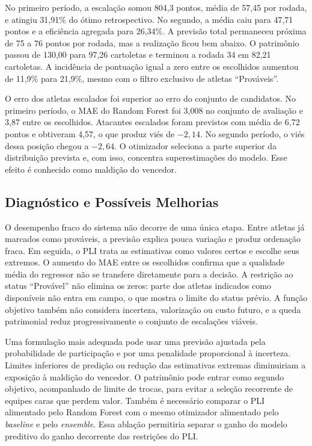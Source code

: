 \documentclass[12pt, a4paper, oneside]{article}
\begin{document}
No primeiro período, a escalação somou 804,3 pontos, média de 57,45 por rodada,
e atingiu 31,91\% do ótimo retrospectivo. No segundo, a média caiu para 47,71
pontos e a eficiência agregada para 26,34\%. A previsão total permaneceu próxima
de 75 a 76 pontos por rodada, mas a realização ficou bem abaixo. O patrimônio
passou de 130,00 para 97,26 cartoletas e terminou a rodada 34 em 82,21 cartoletas.
A incidência de pontuação igual a zero entre os escolhidos aumentou de 11,9\%
para 21,9\%, mesmo com o filtro exclusivo de atletas ``Prováveis''.

O erro dos atletas escalados foi superior ao erro do conjunto de candidatos. No
primeiro período, o MAE do Random Forest foi 3,008 no conjunto de avaliação e
3,87 entre os escolhidos. Atacantes escalados foram previstos com média de 6,72
pontos e obtiveram 4,57, o que produz viés de $-2,14$. No segundo período, o viés
dessa posição chegou a $-2,64$. O otimizador seleciona a parte superior da
distribuição prevista e, com isso, concentra superestimações do modelo. Esse
efeito é conhecido como maldição do vencedor.

\subsection{Diagnóstico e Possíveis Melhorias}

O desempenho fraco do sistema não decorre de uma única etapa. Entre atletas já
marcados como prováveis, a previsão explica pouca variação e produz ordenação
fraca. Em seguida, o PLI trata as estimativas como valores certos e escolhe seus
extremos. O aumento do MAE entre os escolhidos confirma que a qualidade média do
regressor não se transfere diretamente para a decisão. A restrição ao status
``Provável'' não elimina os zeros: parte dos atletas indicados como disponíveis
não entra em campo, o que mostra o limite do status prévio. A função objetivo
também não considera incerteza, valorização ou custo futuro, e a queda
patrimonial reduz progressivamente o conjunto de escalações viáveis.

Uma formulação mais adequada pode usar uma previsão ajustada pela probabilidade
de participação e por uma penalidade proporcional à incerteza. Limites inferiores
de predição ou redução das estimativas extremas diminuiriam a exposição à
maldição do vencedor. O patrimônio pode entrar como segundo objetivo, acompanhado
de limite de trocas, para evitar a seleção recorrente de equipes caras que perdem
valor. Também é necessário comparar o PLI alimentado pelo Random Forest com o
mesmo otimizador alimentado pelo \textit{baseline} e pelo \textit{ensemble}.
Essa ablação permitiria separar o ganho do modelo preditivo do ganho decorrente
das restrições do PLI.
\end{document}
